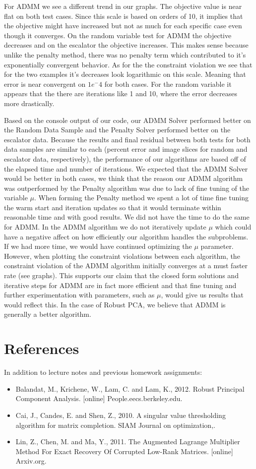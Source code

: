\documentclass[12pt]{article}
\begin{document}
For ADMM we see a different trend in our graphs. The objective value is near flat on both test cases. Since this scale is based on orders of 10, it implies that the objective might have increased but not as much for each specific case even though it converges. On the random variable test for ADMM the objective decreases and on the escalator the objective increases. This makes sense because unlike the penalty method, there was no penalty term which contributed to it's exponentially convergent behavior. As for the the constraint violation we see that for the two examples it's decreases look logarithmic on this scale. Meaning that error is near convergent on $1e^-4$ for both cases. For the random variable it appears that the there are iterations like 1 and 10, where the error decreases more drastically. 

Based on the console output of our code, our ADMM Solver performed better on the Random Data Sample and the Penalty Solver performed better on the escalator data. Because the results and final residual between both tests for both data samples are similar to each (percent error and image slices for random and escalator data, respectively), the performance of our algorithms are based off of the elapsed time and number of iterations. We expected that the ADMM Solver would be better in both cases, we think that the reason our ADMM algorithm was outperformed by the Penalty algorithm was due to lack of fine tuning of the variable $\mu$. When forming the Penalty method we spent a lot of time fine tuning the warm start and iteration updates so that it would terminate within reasonable time and with good results. We did not have the time to do the same for ADMM. In the ADMM algorithm we do not iteratively update $\mu$ which could have a negative affect on how efficiently our algorithm handles the subproblems. If we had more time, we would have continued optimizing the $\mu$ parameter. However, when plotting the constraint violations between each algorithm, the constraint violation of the ADMM algorithm initially converges at a must faster rate (see graphs). This supports our claim that the closed form solutions and iterative steps for ADMM are in fact more efficient and that fine tuning and further experimentation with parameters, such as $\mu$, would give us results that would reflect this. In the case of Robust PCA, we believe that ADMM is generally a better algorithm.
\newpage
\section*{References}
In addition to lecture notes and previous homework assignments:
\begin{itemize}
    \item Balandat, M., Krichene, W., Lam, C. and Lam, K., 2012. Robust Principal Component Analysis. [online] People.eecs.berkeley.edu.
    \item Cai, J., Candes, E. and Shen, Z., 2010. A singular value thresholding algorithm for matrix completion. SIAM Journal on optimization,.
    \item Lin, Z., Chen, M. and Ma, Y., 2011. The Augmented Lagrange Multiplier Method For Exact Recovery Of Corrupted Low-Rank Matrices. [online] Arxiv.org.
\end{itemize}
\end{document}
